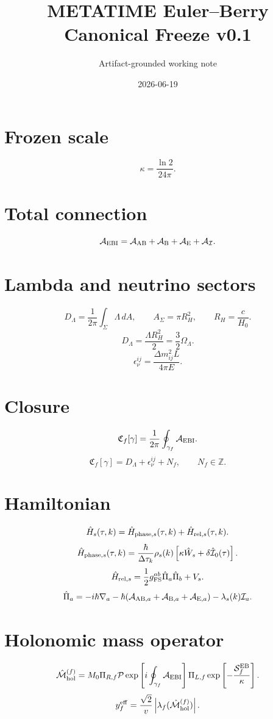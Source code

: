 \documentclass[11pt]{article}
\title{METATIME Euler--Berry Canonical Freeze v0.1}
\author{Artifact-grounded working note}
\date{2026-06-19}
\begin{document}
\maketitle

\section{Frozen scale}
\[
\kappa=\frac{\ln2}{24\pi}.
\]

\section{Total connection}
\[
\mathcal A_{\rm EBI}=\mathcal A_{\rm AB}+\mathcal A_{\rm B}+\mathcal A_{\rm E}+\mathcal A_{\mathcal I}.
\]

\section{Lambda and neutrino sectors}
\[
D_\Lambda=\frac{1}{2\pi}\int_\Sigma\Lambda\,dA,
\qquad A_\Sigma=\pi R_H^2,
\qquad R_H=\frac{c}{H_0}.
\]
\[
D_\Lambda=\frac{\Lambda R_H^2}{2}=\frac32\Omega_\Lambda.
\]
\[
\epsilon_\nu^{ij}=\frac{\Delta m_{ij}^2L}{4\pi E}.
\]

\section{Closure}
\[
\mathfrak C_f[\gamma]=\frac{1}{2\pi}\oint_{\gamma_f}\mathcal A_{\rm EBI}.
\]
\[
\mathfrak C_f[\gamma]=D_\Lambda+\epsilon_\nu^{ij}+N_f,
\qquad N_f\in\mathbb Z.
\]

\section{Hamiltonian}
\[
\hat H_s(\tau,k)=\hat H_{{\rm phase},s}(\tau,k)+\hat H_{{\rm rel},s}(\tau,k).
\]
\[
\hat H_{{\rm phase},s}(\tau,k)
=
\frac{\hbar}{\Delta\tau_k}\rho_s(k)
\left[\kappa\hat W_s+\delta\hat{\mathcal I}_0(\tau)\right].
\]
\[
\hat H_{{\rm rel},s}=\frac12g_{\rm FS}^{ab}\hat\Pi_a\hat\Pi_b+V_s.
\]
\[
\hat\Pi_a=-i\hbar\nabla_a-
\hbar(\mathcal A_{{\rm AB},a}+\mathcal A_{{\rm B},a}+\mathcal A_{{\rm E},a})-
\lambda_s(k)\mathcal I_a.
\]

\section{Holonomic mass operator}
\[
\hat{\mathcal M}^{(f)}_{\rm hol}
=
M_0\Pi_{R,f}\mathcal P\exp\left[i\oint_{\gamma_f}\mathcal A_{\rm EBI}\right]\Pi_{L,f}
\exp\left[-\frac{\mathcal S_f^{\rm EB}}{\kappa}\right].
\]
\[
y_f^{\rm eff}=\frac{\sqrt2}{v}\left|\lambda_f(\hat{\mathcal M}^{(f)}_{\rm hol})\right|.
\]
\end{document}
